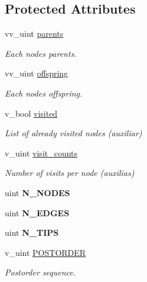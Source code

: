 \subsection*{Protected Attributes}
\begin{DoxyCompactItemize}
\item 
vv\+\_\+uint \hyperlink{classTree_a4d26e079c9d0b250a4bda27de8ad223c}{parents}\hypertarget{classTree_a4d26e079c9d0b250a4bda27de8ad223c}{}\label{classTree_a4d26e079c9d0b250a4bda27de8ad223c}

\begin{DoxyCompactList}\small\item\em Each nodes\textquotesingle{} parents. \end{DoxyCompactList}\item 
vv\+\_\+uint \hyperlink{classTree_ade5fd3ba5b6480c4edf8590eb0e41e34}{offspring}\hypertarget{classTree_ade5fd3ba5b6480c4edf8590eb0e41e34}{}\label{classTree_ade5fd3ba5b6480c4edf8590eb0e41e34}

\begin{DoxyCompactList}\small\item\em Each nodes\textquotesingle{} offspring. \end{DoxyCompactList}\item 
v\+\_\+bool \hyperlink{classTree_a45813764070bd88238a3372c16b423fa}{visited}\hypertarget{classTree_a45813764070bd88238a3372c16b423fa}{}\label{classTree_a45813764070bd88238a3372c16b423fa}

\begin{DoxyCompactList}\small\item\em List of already visited nodes (auxiliar) \end{DoxyCompactList}\item 
v\+\_\+uint \hyperlink{classTree_ac504d0c090c1f76363fc00cff2de0e7f}{visit\+\_\+counts}\hypertarget{classTree_ac504d0c090c1f76363fc00cff2de0e7f}{}\label{classTree_ac504d0c090c1f76363fc00cff2de0e7f}

\begin{DoxyCompactList}\small\item\em Number of visits per node (auxilias) \end{DoxyCompactList}\item 
uint {\bfseries N\+\_\+\+N\+O\+D\+ES}\hypertarget{classTree_a41b7a5ddd47b82688c099ee47561eb4f}{}\label{classTree_a41b7a5ddd47b82688c099ee47561eb4f}

\item 
uint {\bfseries N\+\_\+\+E\+D\+G\+ES}\hypertarget{classTree_a123cdf871af449443aa8b7c05029d72a}{}\label{classTree_a123cdf871af449443aa8b7c05029d72a}

\item 
uint {\bfseries N\+\_\+\+T\+I\+PS}\hypertarget{classTree_afe09b17dd0f475dcbc4054892863050e}{}\label{classTree_afe09b17dd0f475dcbc4054892863050e}

\item 
v\+\_\+uint \hyperlink{classTree_a310e76b803db38e7067514822b21a58f}{P\+O\+S\+T\+O\+R\+D\+ER}
\begin{DoxyCompactList}\small\item\em Postorder sequence. \end{DoxyCompactList}\end{DoxyCompactItemize}
